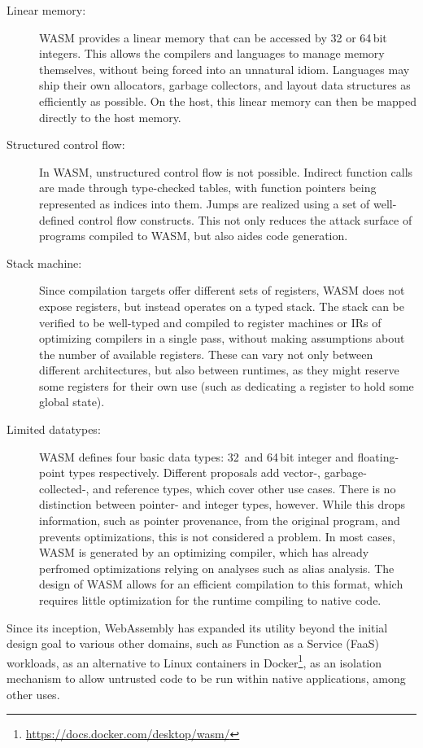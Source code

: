 \begin{description}
    \item[Linear memory:] \Ac{WASM} provides a linear memory that can be accessed by 32 or 64\,bit integers.
    This allows the compilers and languages to manage memory themselves, without being forced into an unnatural idiom.
    Languages may ship their own allocators, garbage collectors, and layout data structures as efficiently as possible.
    On the host, this linear memory can then be mapped directly to the host memory.
    \item[Structured control flow:] In \ac{WASM}, unstructured control flow is not possible.
    Indirect function calls are made through type-checked tables, with function pointers being represented as indices into them.
    Jumps are realized using a set of well-defined control flow constructs.
    This not only reduces the attack surface of programs compiled to \ac{WASM}, but also aides code generation. 
    \item[Stack machine:] Since compilation targets offer different sets of registers, \ac{WASM} does not expose registers, but instead operates on a typed stack.
    The stack can be verified to be well-typed and compiled to register machines or \acp{IR} of optimizing compilers in a single pass, without making assumptions about the number of available registers.
    These can vary not only between different architectures, but also between runtimes, as they might reserve some registers for their own use (such as dedicating a register to hold some global state).
    \item[Limited datatypes:] \Ac{WASM} defines four basic data types: 32\, and 64\,bit integer and floating-point types respectively.
    Different proposals add \mbox{vector-}, \mbox{garbage-collected-}, and reference types, which cover other use cases.
    There is no distinction between pointer- and integer types, however.
    While this drops information, such as pointer provenance, from the original program, and prevents optimizations, this is not considered a problem.
    In most cases, \ac{WASM} is generated by an optimizing compiler, which has already perfromed optimizations relying on analyses such as alias analysis.
    The design of \ac{WASM} allows for an efficient compilation to this format, which requires little optimization for the runtime compiling to native code.
\end{description}

Since its inception, WebAssembly has expanded its utility beyond the initial design goal to various other domains, such as Function as a Service (FaaS) workloads, as an alternative to Linux containers in Docker\footnote{\url{https://docs.docker.com/desktop/wasm/}}, as an isolation mechanism to allow untrusted code to be run within native applications, among other uses.

